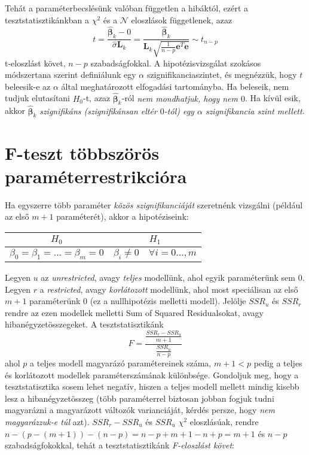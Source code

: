 \documentclass[14p]{report}
\def\pmb{\boldsymbol}
\def\ebeta{\hat{\pmb{\beta}}}
\newcounter{y}
\newcounter{z}
\begin{document}
	Tehát a paraméterbecslésünk valóban független a hibáktól, ezért a tesztstatisztikánkban a $\chi^2$ és a $\mathcal{N}$ eloszlások függetlenek, azaz
	\[
		t = \frac{\ebeta_k - 0}{\widehat{\sigma}\pmb{L}_{k}} = \frac{\ebeta_k}{\pmb{L}_k\sqrt{\frac{1}{n-p}\pmb{e}^T\pmb{e}}} \sim t_{n-p}
	\]
	t-eloszlást követ, $n-p$ szabadságfokkal. A hipotézisvizsgálat szokásos módszertana szerint definiálunk egy $\alpha$ szignifikanciaszintet, és megnézzük, hogy $t$ beleesik-e az $\alpha$ által meghatározott elfogadási tartományba. Ha beleseik, nem tudjuk elutasítani $H_0$-t, azaz $\ebeta_k$-ról \emph{nem mondhatjuk, hogy nem $0$}. Ha kívül esik, akkor $\ebeta_k$ \emph{szignifikáns (szignifikánsan eltér $0$-tól) egy $\alpha$ szignifikancia szint mellett}.
	
	\section{F-teszt többszörös paraméterrestrikcióra}
	Ha egyszerre több paraméter \emph{közös szignifikanciáját} szeretnénk vizsgálni (például az első $m+1$ paraméterét), akkor a hipotéziseink:
	\begin{center}
		\begin{tabular}{|c|c|}
			\hline
			$H_0$ & $H_1$ \\
			\hline
			$\beta_0 = \beta_1 = \dots = \beta_m = 0$ & $\beta_i \ne 0\quad \forall i = 0 \dots,m$ \\
			\hline
		\end{tabular}
	\end{center}
	Legyen $u$ az \emph{unrestricted}, avagy \emph{teljes} modellünk, ahol egyik paraméterünk sem $0$. Legyen $r$ a \emph{restricted}, avagy \emph{korlátozott} modellünk, ahol most speciálisan az első $m+1$ paraméterünk $0$ (ez a nullhipotézis melletti modell). Jelölje $SSR_u$ és $SSR_r$ rendre az ezen modellek melletti Sum of Squared Residualsokat, avagy hibanégyzetösszegeket. A tesztstatisztikánk
	\[
		F = \frac{\frac{SSR_r - SSR_u}{m+1}}{\frac{SSR_u}{n-p}}
	\]
	ahol $p$ a teljes modell magyarázó paramétereinek száma, $m+1 < p$ pedig a teljes és korlátozott modellek paraméterszámának különbsége. Gondoljuk meg, hogy a tesztstatisztika sosem lehet negatív, hiszen a teljes modell mellett mindig kisebb lesz a hibanégyzetösszeg (több paraméterrel biztosan jobban fogjuk tudni magyarázni a magyarázott változók varianciáját, kérdés persze, hogy \emph{nem magyarázzuk-e túl} azt).
	$SSR_r - SSR_u$ és $SSR_u$ $\chi^2$ eloszlásúak, rendre $n-(p-(m+1))-(n-p) = n-p+m+1-n+p = m+1$ és $n-p$ szabadságfokokkal, tehát a tesztstatisztikánk \emph{F-eloszlást követ}:
	
\end{document}
